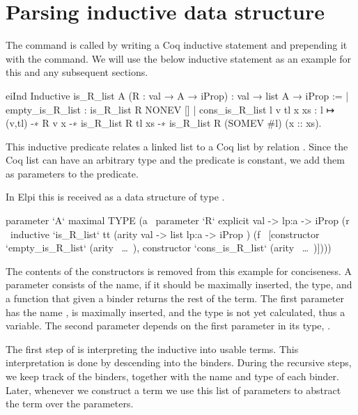 \documentclass[thesis.tex]{subfiles}
\begin{document}
\section{Parsing inductive data structure}\label{sec:inductivedata}
The  command is called by writing a Coq inductive statement and prepending it with the  command. We will use the below inductive statement as an example for this and any subsequent sections.
\begin{coqcode}
  eiInd
  Inductive is_R_list {A} (R : val → A → iProp) : 
                      val → list A → iProp :=
    | empty_is_R_list : is_R_list R NONEV []
    | cons_is_R_list l v tl x xs : 
        l ↦ (v,tl) -∗ R v x -∗ is_R_list R tl xs -∗ 
        is_R_list R (SOMEV #l) (x :: xs).
\end{coqcode}
This inductive predicate relates a linked list to a Coq list by relation . Since the Coq list can have an arbitrary type  and the predicate  is constant, we add them as parameters to the predicate.

In Elpi this is received as a data structure of type .
\begin{elpicode}
  parameter `A` maximal 
    TYPE
    (a \ parameter `R` explicit 
          {{ val -> lp:a -> iProp }} 
          (r \ inductive `is_R_list` tt 
                (arity {{ val -> list lp:a -> iProp }})
                (f \ [constructor `empty_is_R_list` 
                        (arity ~\ldots~), 
                      constructor `cons_is_R_list` 
                        (arity ~\ldots~)])))
\end{elpicode}
The contents of the constructors is removed from this example for conciseness. A parameter consists of the name, if it should be maximally inserted, the type, and a function that given a binder returns the rest of the term. The first parameter has the name , is maximally inserted, and the type is not yet calculated, thus a variable. The second parameter  depends on the first parameter in its type, .

The first step of  is interpreting the inductive into usable terms.
This interpretation is done by descending into the binders. During the recursive steps, we keep track of the binders, together with the name and type of each binder. Later, whenever we construct a term we use this list of parameters to abstract the term over the parameters.
\end{document}

